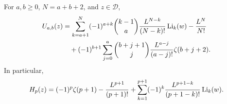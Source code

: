 \begin{theorem}
\label{recip:one2:thm:closed}
For $a,b\ge0$, $N=a+b+2$, and $z\in\mathcal D$,
\begin{align}
 U_{a,b}(z)
 &=\sum_{k=a+1}^{N}(-1)^{a+k}\binom{k-1}{a}
       \frac{L^{N-k}}{(N-k)!}\operatorname{Li}_k(w)
       -\frac{L^N}{N!}\notag\\
 &\quad+(-1)^{b+1}\sum_{j=0}^{a}\binom{b+j+1}{j}
       \frac{L^{a-j}}{(a-j)!}\zeta(b+j+2).
 \label{recip:one2:eq:closed}
\end{align}
In particular,
\begin{equation}
 H_p(z)=(-1)^p\zeta(p+1)-\frac{L^{p+1}}{(p+1)!}
 +\sum_{k=1}^{p+1}(-1)^k
       \frac{L^{p+1-k}}{(p+1-k)!}\operatorname{Li}_k(w).
 \label{recip:one2:eq:height}
\end{equation}
\end{theorem}
